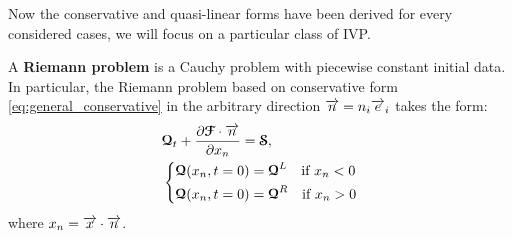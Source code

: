Now the conservative and quasi-linear forms have been derived for every considered cases, we will focus on a particular class of IVP.
\begin{definition}
  A \textbf{Riemann problem} is a Cauchy problem with piecewise constant initial data. In particular, the Riemann problem based on conservative form \eqref{eq:general_conservative} in the arbitrary direction ${\overrightarrow{n}}=n_i {\overrightarrow{e}}_i$ takes the form:
  \begin{equation}
  \label{eq:Riemann_problem}
  \begin{aligned}
  &{\boldsymbol{\mathcal{Q}}}_t + \frac{\partial {\boldsymbol{\mathcal{F}}}\cdot {\overrightarrow{n}}}{\partial x_n} = {\boldsymbol{\mathcal{S}}}, \\
  &\left\lbrace 
    \begin{aligned}
      & {\boldsymbol{\mathcal{Q}}}(x_n,t=0) = {\boldsymbol{\mathcal{Q}}}^L \quad \text{if } x_n< 0\\
      & {\boldsymbol{\mathcal{Q}}}(x_n,t=0) = {\boldsymbol{\mathcal{Q}}}^R \quad \text{if } x_n> 0
    \end{aligned}
    \right.
  \end{aligned}
\end{equation}
where $x_n={\overrightarrow{x}}\cdot{\overrightarrow{n}}$.
\end{definition}


